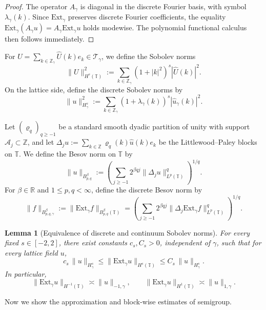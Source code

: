 \documentclass{article}
\newtheorem{lemma}{Lemma}
\begin{document}
\begin{proof}
The operator \(A_\gamma\) is diagonal in the discrete Fourier basis, with symbol \(\lambda_\gamma(k)\).
Since \(\mathrm{Ext}_\gamma\) preserves discrete Fourier coefficients, the equality
\(
 \mathrm{Ext}_\gamma(A_\gamma u)=  A_\gamma \mathrm{Ext}_\gamma u
\)
holds modewise. The polynomial functional calculus then follows immediately.
\end{proof}


For \(U=\sum_{k\in\mathbb Z_\gamma}\widehat U(k)e_k\in\mathcal T_\gamma\), we define the Sobolev norms 
\[
\|U\|_{H^s(\mathbb T)}^2
:=
\sum_{k\in\mathbb Z_\gamma}(1+|k|^2)^s|\widehat U(k)|^2.
\]
On the lattice side, define the discrete Sobolev norms by
\[
\|u\|_{H^s_\gamma}^2
:=
\sum_{k\in\mathbb Z_\gamma}(1+\lambda_\gamma(k))^s|\widehat u_\gamma(k)|^2.
\]

Let \((\varrho_q)_{q\ge -1}\) be a standard smooth dyadic partition of unity with support \(\mathcal A_j \subset \mathbb Z\), and let
\(
\Delta_j u
:=
\sum_{k\in\mathbb Z}\varrho_q(k)\widehat u(k)e_k
\)
be the Littlewood--Paley blocks on \(\mathbb T\).
We define the Besov norm on \(\mathbb T\) by
\[
\|u\|_{B^\beta_{p,q}}
:= \left( \sum_{j \ge -1}2^{\beta q j }\|\Delta_j u\|_{L^p(\mathbb T)}^q \right)^{1/q}.
\]
For \(\beta\in\mathbb R\) and \(1\le p,q<\infty\), define the discrete Besov norm by
\[
\|f\|_{B^\beta_{p,q,\gamma}}
:=
\|\mathrm{Ext}_\gamma f\|_{B^\beta_{p,q}(\mathbb T)}
=
\left(
\sum_{j \ge -1}2^{\beta qj}\|\Delta_j \mathrm{Ext}_\gamma f\|_{L^p(\mathbb T)}^q
\right)^{1/q}.
\]


\begin{lemma}[Equivalence of discrete and continuum Sobolev norms]
\label{lem:fourier-norm-equivalence}
For every fixed \(s\in[-2,2]\), there exist constants \(c_s,C_s>0\), independent of \(\gamma\), such that
for every lattice field \(u\),
\[
c_s\,\|u\|_{H^s_\gamma}
\le
\| \mathrm{Ext}_\gamma u\|_{H^s(\mathbb T)}
\le
C_s\,\|u\|_{H^s_\gamma}.
\]
In particular,
\[
\|\mathrm{Ext}_\gamma u\|_{H^{-1}(\mathbb T)}\asymp \|u\|_{-1,\gamma},
\qquad
\|\mathrm{Ext}_\gamma u\|_{H^1(\mathbb T)}\asymp \|u\|_{1,\gamma}.
\]
\end{lemma}

Now we show the approximation and block-wise estimates of semigroup.
\end{document}
